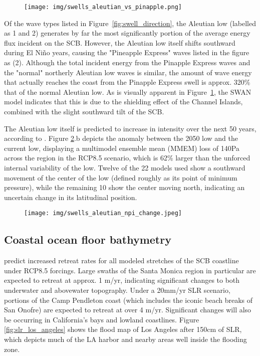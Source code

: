\documentclass[12pt, letterpaper]{article}
\begin{document}
	\begin{figure}[h]
		\centering
		\texttt{[image: img/swells\_aleutian\_vs\_pinapple.png]}
		\caption{\citep{swells-deep-water-waves}}
		\label{fig:aleutian_vs_pineapple}
	\end{figure}

	Of the wave types listed in Figure~\ref{fig:swell_direction}, the Aleutian low (labelled as 1 and 2) generates by far the most significantly portion of the average energy flux incident on the SCB. However, the Aleutian low itself shifts southward during El Ni\~no years, causing the "Pineapple Express" waves listed in the figure as (2). Although the total incident energy from the Pinapple Express waves and the "normal" northerly Aleutian low waves is similar, the amount of wave energy that actually reaches the coast from the Pinapple Express swell is approx. 320\% that of the normal Aleutian low. \citep{swells-deep-water-waves} As is visually apparent in Figure~\ref{fig:aleutian_vs_pineapple}, the SWAN model indicates that this is due to the shielding effect of the Channel Islands, combined with the slight southward tilt of the SCB.

	The Aleutian low itself is predicted to increase in intensity over the next 50 years, according to \citeauthor{swells-aleutian-low}. Figure \ref{fig:aleutian_npi_change}.b depicts the anomaly between the 2050 low and the current low, displaying a multimodel ensemble mean (MMEM) loss of 140Pa across the region in the RCP8.5 scenario, which is 62\% larger than the unforced internal variability of the low. Twelve of the 22 models used show a southward movement of the center of the low (defined roughly as its point of minimum pressure), while the remaining 10 show the center moving north, indicating an uncertain change in its latitudinal position. \citep{swells-aleutian-low}

	\begin{figure}[h]
		\centering
		\texttt{[image: img/swells\_aleutian\_npi\_change.jpeg]}
		\caption{\citep{swells-deep-water-waves}}
		\label{fig:aleutian_npi_change}
	\end{figure}

	\subsection{Coastal ocean floor bathymetry}
	\citeauthor{bath-cosmos} predict increased retreat rates for all modeled stretches of the SCB coastline under RCP8.5 forcings. Large swaths of the Santa Monica region in particular are expected to retreat at approx. 1 m/yr, indicating significant changes to both underwater and abovewater topography. Under a 20mm/yr SLR scenario, portions of the Camp Pendleton coast (which includes the iconic beach breaks of San Onofre) are expected to retreat at over 4 m/yr.
	Significant changes will also be occurring in California's bays and lowland coastlines. Figure \ref{fig:slr_los_angeles} shows the flood map of Los Angeles after 150cm of SLR, which depicts much of the LA harbor and nearby areas well inside the flooding zone. \citep{bath-cosmos}
\end{document}
